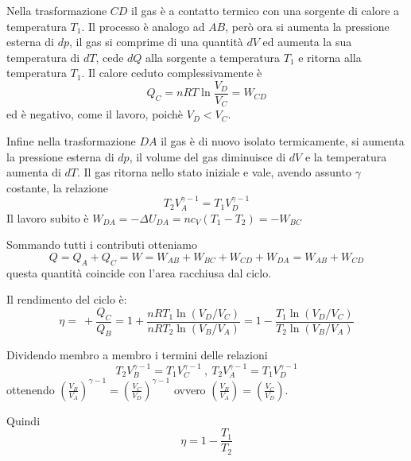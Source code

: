 \documentclass[class=book, crop=false, oneside, 12pt]{standalone}
\begin{document}
Nella trasformazione \(C D\) il gas è a contatto termico con una sorgente di calore a temperatura \(T_1\). 
Il processo è analogo ad \(A B\), però ora si aumenta la pressione esterna di \(d p\), il gas si comprime di una quantità \(d V\) ed aumenta la sua temperatura di \(d T\), cede \(d Q\) alla sorgente a temperatura \(T_1\) e ritorna alla temperatura \(T_1\). 
Il calore ceduto complessivamente è 
\begin{equation*}
    Q_C = n R T \ln \frac{V_D}{V_C} = W_{CD}
\end{equation*}
ed è negativo, come il lavoro, poichè \(V_D < V_C\).

Infine nella trasformazione \(D A\) il gas è di nuovo isolato termicamente, si aumenta la pressione esterna di \(d p\), il volume del gas diminuisce di \(d V\) e  la temperatura aumenta di \(d T\). 
Il gas ritorna nello stato iniziale e vale, avendo assunto \(\gamma\) costante, la relazione
\begin{equation*}
    T_2 V_A^{\gamma - 1} = T_1 V_D^{\gamma - 1}
\end{equation*}
Il lavoro subito è \(W_{DA} = -\Delta U_{DA} = n c_V \left(T_1 - T_2\right) = - W_{BC}\)

Sommando tutti i contributi otteniamo
\begin{equation*}
    Q = Q_A + Q_C = W = W_{AB} + W_{BC} + W_{CD} + W_{DA} = W_{AB} + W_{CD}
\end{equation*}
questa quantità coincide con l'area racchiusa dal ciclo.

Il rendimento del ciclo è:
\begin{equation*}
    \eta = \ + \frac{Q_C}{Q_B} = 1 + \frac{n R T_1 \ln \left(V_D / V_C \right) }{n R T_2 \ln \left(V_B / V_A \right)} = 1 - \frac{T_1 \ln \left(V_D / V_C \right) }{T_2 \ln \left(V_B / V_A \right)}
\end{equation*}

Dividendo membro a membro i termini delle relazioni
\begin{equation*}
    T_2 V_B^{\gamma - 1} = T_1 V_C^{\gamma - 1} \ , \ T_2 V_A^{\gamma - 1} = T_1 V_D^{\gamma - 1} 
\end{equation*}
ottenendo \(\left(\frac{V_B}{V_A}\right)^{\gamma - 1} = \left(\frac{V_C}{V_D}\right)^{\gamma - 1}\) ovvero \(\left(\frac{V_B}{V_A}\right) = \left(\frac{V_C}{V_D}\right)\).

Quindi
\begin{equation}
    \eta = 1 - \frac{T_1}{T_2}
\end{equation}
\end{document}
